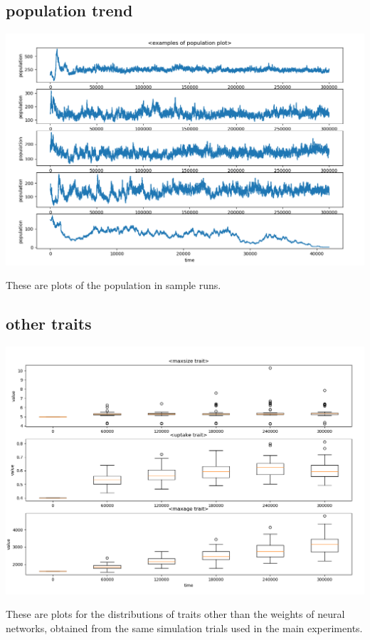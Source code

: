 \documentclass{article}
\numberwithin{equation}{section}
\begin{document}
\subsection{population trend}
\begin{center}
\includegraphics[scale=0.3]{images/population.png}
\end{center}
These are plots of the population in sample runs. 

\subsection{other traits}
\begin{center}
\includegraphics[scale=0.3]{images/traits.png}
\end{center}
These are plots for the distributions of traits other than the weights of neural networks, obtained from the same simulation trials used in the main experiments. 
\end{document}
